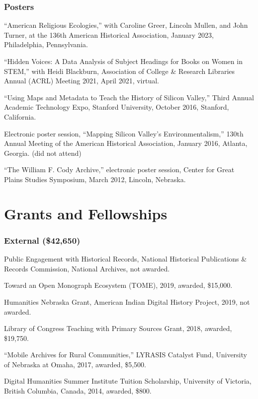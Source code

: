 \subsubsection{Posters}\label{posters}

``American Religious Ecologies,'' with Caroline Greer, Lincoln Mullen,
and John Turner, at the 136th American Historical Association, January
2023, Philadelphia, Pennsylvania.

``Hidden Voices: A Data Analysis of Subject Headings for Books on Women
in STEM,'' with Heidi Blackburn, Association of College \& Research
Libraries Annual (ACRL) Meeting 2021, April 2021, virtual.

``Using Maps and Metadata to Teach the History of Silicon Valley,''
Third Annual Academic Technology Expo, Stanford University, October
2016, Stanford, California.

Electronic poster session, ``Mapping Silicon Valley's
Environmentalism,'' 130th Annual Meeting of the American Historical
Association, January 2016, Atlanta, Georgia. (did not attend)

``The William F. Cody Archive,'' electronic poster session, Center for
Great Plains Studies Symposium, March 2012, Lincoln, Nebraska.

\section{Grants and Fellowships}\label{grants-and-fellowships}

\subsubsection{External (\$42,650)}\label{external-42650}

Public Engagement with Historical Records, National Historical
Publications \& Records Commission, National Archives, not awarded.

Toward an Open Monograph Ecosystem (TOME), 2019, awarded, \$15,000.

Humanities Nebraska Grant, American Indian Digital History Project,
2019, not awarded.

Library of Congress Teaching with Primary Sources Grant, 2018, awarded,
\$19,750.

``Mobile Archives for Rural Communities,'' LYRASIS Catalyst Fund,
University of Nebraska at Omaha, 2017, awarded, \$5,500.

Digital Humanities Summer Institute Tuition Scholarship, University of
Victoria, British Columbia, Canada, 2014, awarded, \$800.

